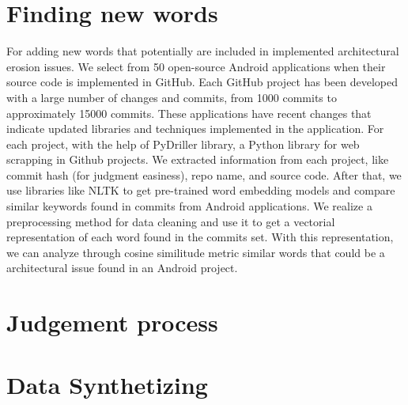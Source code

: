\section{Finding new words}
For adding new words that potentially are included in implemented architectural erosion issues. We select from 50 open-source Android applications when their source code is implemented in GitHub. Each GitHub project has been developed with a large number of changes and commits, from 1000 commits to approximately 15000 commits. These applications have recent changes that indicate updated libraries and techniques implemented in the application. For each project, with the help of PyDriller library, a Python library for web scrapping in Github projects. We extracted information from each project, like commit hash (for judgment easiness), repo name, and source code.
After that, we use libraries like NLTK to get pre-trained word embedding models and compare similar keywords found in commits from Android applications. We realize a preprocessing method for data cleaning and use it to get a vectorial representation of each word found in the commits set. With this representation, we can analyze through cosine similitude metric similar words that could be a architectural issue found in an Android project.


\section{Judgement process}

\section{Data Synthetizing}